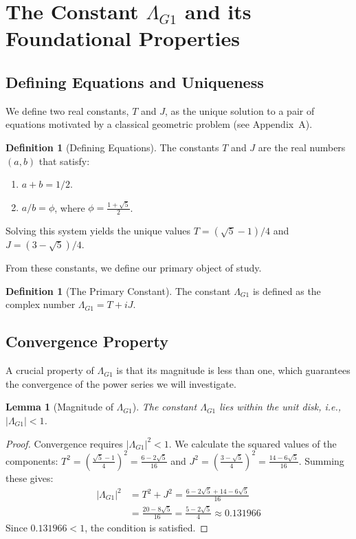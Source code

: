 \documentclass{amsart}
\theoremstyle{plain}
\newtheorem{lemma}[theorem]{Lemma}
\theoremstyle{definition}
\newtheorem{definition}[theorem]{Definition}
\theoremstyle{remark}
\newcommand{\LambdaG}{\Lambda_{G1}}
\begin{document}
\section{The Constant \texorpdfstring{$\Lambda_{G1}$}{Lambda\_G1} and its Foundational Properties}

\subsection{Defining Equations and Uniqueness}
We define two real constants, $T$ and $J$, as the unique solution to a pair of equations motivated by a classical geometric problem (see Appendix~A).

\begin{definition}[Defining Equations]
The constants $T$ and $J$ are the real numbers $(a,b)$ that satisfy:
\begin{enumerate}
    \item $a+b = 1/2$.
    \item $a/b = \phi$, where $\phi = \frac{1+\sqrt{5}}{2}$.
\end{enumerate}
Solving this system yields the unique values $T = (\sqrt{5}-1)/4$ and $J = (3-\sqrt{5})/4$.
\end{definition}

From these constants, we define our primary object of study.
\begin{definition}[The Primary Constant]
The constant $\LambdaG$ is defined as the complex number $\LambdaG = T+iJ$.
\end{definition}

\subsection{Convergence Property}
A crucial property of $\LambdaG$ is that its magnitude is less than one, which guarantees the convergence of the power series we will investigate.

\begin{lemma}[Magnitude of $\LambdaG$]
\label{lem:convergence}
The constant $\LambdaG$ lies within the unit disk, i.e., $|\LambdaG| < 1$.
\end{lemma}
\begin{proof}
Convergence requires $|\LambdaG|^2 < 1$. We calculate the squared values of the components:
$T^2 = \left(\frac{\sqrt{5}-1}{4}\right)^2 = \frac{6-2\sqrt{5}}{16}$ and $J^2 = \left(\frac{3-\sqrt{5}}{4}\right)^2 = \frac{14-6\sqrt{5}}{16}$.
Summing these gives:
\begin{align*}
    |\LambdaG|^2 &= T^2+J^2 = \frac{6-2\sqrt{5} + 14-6\sqrt{5}}{16} \\
                 &= \frac{20-8\sqrt{5}}{16} = \frac{5-2\sqrt{5}}{4} \approx 0.131966
\end{align*}
Since $0.131966 < 1$, the condition is satisfied.
\end{proof}
\end{document}
